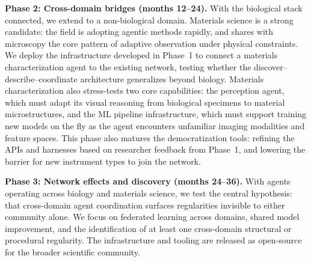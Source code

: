 \documentclass[11pt]{article}
\begin{document}
\textbf{Phase 2: Cross-domain bridges (months 12--24).}
With the biological stack connected, we extend to a non-biological domain.
Materials science is a strong candidate: the field is adopting agentic methods rapidly, and shares with microscopy the core pattern of adaptive observation under physical constraints.
We deploy the infrastructure developed in Phase~1 to connect a materials characterization agent to the existing network, testing whether the discover--describe--coordinate architecture generalizes beyond biology.
Materials characterization also stress-tests two core capabilities: the perception agent, which must adapt its visual reasoning from biological specimens to material microstructures, and the ML pipeline infrastructure, which must support training new models on the fly as the agent encounters unfamiliar imaging modalities and feature spaces.
This phase also matures the democratization tools: refining the APIs and harnesses based on researcher feedback from Phase~1, and lowering the barrier for new instrument types to join the network.

\textbf{Phase 3: Network effects and discovery (months 24--36).}
With agents operating across biology and materials science, we test the central hypothesis: that cross-domain agent coordination surfaces regularities invisible to either community alone.
We focus on federated learning across domains, shared model improvement, and the identification of at least one cross-domain structural or procedural regularity.
The infrastructure and tooling are released as open-source for the broader scientific community.
\end{document}
